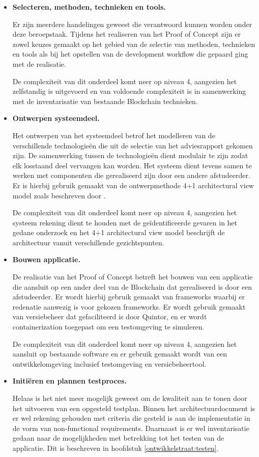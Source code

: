 \begin{itemize}
  \item \textbf{Selecteren, methoden, technieken en tools.}
  
  Er zijn meerdere handelingen geweest die verantwoord kunnen worden onder deze beroepstaak. Tijdens het realiseren van het Proof of Concept zijn er zowel keuzes gemaakt op het gebied van de selectie van methoden, technieken en tools als bij het opstellen van de development workflow die gepaard ging met de realisatie. 
  
  De complexiteit van dit onderdeel komt neer op niveau 4, aangezien het zelfstandig is uitgevoerd en van voldoende complexiteit is in samenwerking met de inventarisatie van bestaande Blockchain technieken.
  \item \textbf{Ontwerpen systeemdeel.}
  
  Het ontwerpen van het systeemdeel betrof het modelleren van de verschillende technologieën die uit de selectie van het adviesrapport gekomen zijn. De samenwerking tussen de technologieën dient modulair te zijn zodat elk losstaand deel vervangen kan worden. Het systeem dient tevens samen te werken met componenten die gerealiseerd zijn door een andere afstudeerder. Er is hierbij gebruik gemaakt van de ontwerpmethode 4+1 architectural view model zoals beschreven door \cite{kruchten19954+}. 
  
  De complexiteit van dit onderdeel komt neer op niveau 4, aangezien het systeem rekening dient te houden met de geïdentificeerde gevaren in het gedane onderzoek en het 4+1 architectural view model beschrijft de architectuur vanuit verschillende gezichtspunten.

  \item \textbf{Bouwen applicatie.}

  De realisatie van het Proof of Concept betreft het bouwen van een applicatie die aansluit op een ander deel van de Blockchain dat gerealiseerd is door een afstudeerder. Er wordt hierbij gebruik gemaakt van frameworks waarbij er redenatie aanwezig is voor gekozen frameworks. Er wordt gebruik gemaakt van versiebeheer dat gefaciliteerd is door Quintor, en er wordt containerization toegepast om een testomgeving te simuleren.

  De complexiteit van dit onderdeel komt neer op niveau 4, aangezien het aansluit op bestaande software en er gebruik gemaakt wordt van een ontwikkelomgeving inclusief testomgeving en versiebeheertool.

  \item \textbf{Initiëren en plannen testproces.}

  Helaas is het niet meer mogelijk geweest om de kwaliteit aan te tonen door het uitvoeren van een opgesteld testplan. Binnen het architectuurdocument is er wel rekening gehouden met criteria die gesteld is aan de implementatie in de vorm van non-functional requirements. Daarnaast is er wel inventarisatie gedaan naar de mogelijkheden met betrekking tot het testen van de applicatie. Dit is beschreven in hoofdstuk \ref{ontwikkelstraat:testen}.
  
\end{itemize}



